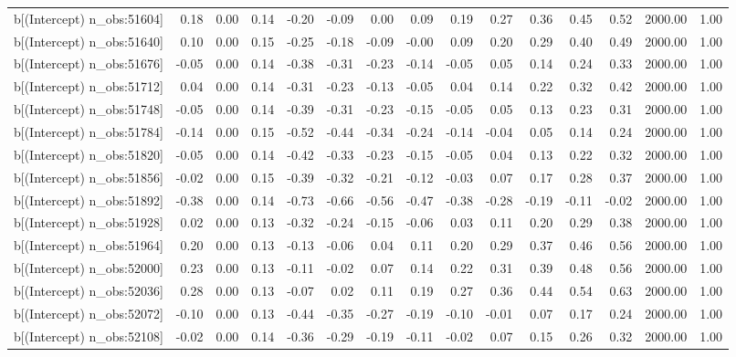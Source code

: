 \begin{table}[ht]
\begin{tabular}{rrrrrrrrrrrrrrr}
  b[(Intercept) n\_obs:51604] & 0.18 & 0.00 & 0.14 & -0.20 & -0.09 & 0.00 & 0.09 & 0.19 & 0.27 & 0.36 & 0.45 & 0.52 & 2000.00 & 1.00 \\ 
  b[(Intercept) n\_obs:51640] & 0.10 & 0.00 & 0.15 & -0.25 & -0.18 & -0.09 & -0.00 & 0.09 & 0.20 & 0.29 & 0.40 & 0.49 & 2000.00 & 1.00 \\ 
  b[(Intercept) n\_obs:51676] & -0.05 & 0.00 & 0.14 & -0.38 & -0.31 & -0.23 & -0.14 & -0.05 & 0.05 & 0.14 & 0.24 & 0.33 & 2000.00 & 1.00 \\ 
  b[(Intercept) n\_obs:51712] & 0.04 & 0.00 & 0.14 & -0.31 & -0.23 & -0.13 & -0.05 & 0.04 & 0.14 & 0.22 & 0.32 & 0.42 & 2000.00 & 1.00 \\ 
  b[(Intercept) n\_obs:51748] & -0.05 & 0.00 & 0.14 & -0.39 & -0.31 & -0.23 & -0.15 & -0.05 & 0.05 & 0.13 & 0.23 & 0.31 & 2000.00 & 1.00 \\ 
  b[(Intercept) n\_obs:51784] & -0.14 & 0.00 & 0.15 & -0.52 & -0.44 & -0.34 & -0.24 & -0.14 & -0.04 & 0.05 & 0.14 & 0.24 & 2000.00 & 1.00 \\ 
  b[(Intercept) n\_obs:51820] & -0.05 & 0.00 & 0.14 & -0.42 & -0.33 & -0.23 & -0.15 & -0.05 & 0.04 & 0.13 & 0.22 & 0.32 & 2000.00 & 1.00 \\ 
  b[(Intercept) n\_obs:51856] & -0.02 & 0.00 & 0.15 & -0.39 & -0.32 & -0.21 & -0.12 & -0.03 & 0.07 & 0.17 & 0.28 & 0.37 & 2000.00 & 1.00 \\ 
  b[(Intercept) n\_obs:51892] & -0.38 & 0.00 & 0.14 & -0.73 & -0.66 & -0.56 & -0.47 & -0.38 & -0.28 & -0.19 & -0.11 & -0.02 & 2000.00 & 1.00 \\ 
  b[(Intercept) n\_obs:51928] & 0.02 & 0.00 & 0.13 & -0.32 & -0.24 & -0.15 & -0.06 & 0.03 & 0.11 & 0.20 & 0.29 & 0.38 & 2000.00 & 1.00 \\ 
  b[(Intercept) n\_obs:51964] & 0.20 & 0.00 & 0.13 & -0.13 & -0.06 & 0.04 & 0.11 & 0.20 & 0.29 & 0.37 & 0.46 & 0.56 & 2000.00 & 1.00 \\ 
  b[(Intercept) n\_obs:52000] & 0.23 & 0.00 & 0.13 & -0.11 & -0.02 & 0.07 & 0.14 & 0.22 & 0.31 & 0.39 & 0.48 & 0.56 & 2000.00 & 1.00 \\ 
  b[(Intercept) n\_obs:52036] & 0.28 & 0.00 & 0.13 & -0.07 & 0.02 & 0.11 & 0.19 & 0.27 & 0.36 & 0.44 & 0.54 & 0.63 & 2000.00 & 1.00 \\ 
  b[(Intercept) n\_obs:52072] & -0.10 & 0.00 & 0.13 & -0.44 & -0.35 & -0.27 & -0.19 & -0.10 & -0.01 & 0.07 & 0.17 & 0.24 & 2000.00 & 1.00 \\ 
  b[(Intercept) n\_obs:52108] & -0.02 & 0.00 & 0.14 & -0.36 & -0.29 & -0.19 & -0.11 & -0.02 & 0.07 & 0.15 & 0.26 & 0.32 & 2000.00 & 1.00 \\ 

\end{tabular}
\end{table}
